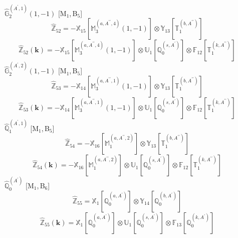 \documentclass[fleqn,10pt,landscape]{article}
\begin{document}
\begin{itemize}
\vspace{4mm}
\noindent {} $\,\,\,\hat{\mathbb{G}}_{2}^{(A^{\prime},1)}(1,-1)$ [M$_{1}$,\,B$_{5}$]
\begin{dmath*}
\hat{\mathbb{Z}}_{52}=- \mathbb{X}_{15}[\mathbb{M}_{3}^{(a,A^{\prime\prime},4)}(1,-1)] \otimes\mathbb{Y}_{13}[\mathbb{T}_{1}^{(b,A^{\prime\prime})}]
\end{dmath*}
\begin{dmath*}
\hat{\mathbb{Z}}_{52}(\bm{k})=- \mathbb{X}_{15}[\mathbb{M}_{3}^{(a,A^{\prime\prime},4)}(1,-1)] \otimes\mathbb{U}_{1}[\mathbb{Q}_{0}^{(s,A^{\prime})}] \otimes\mathbb{F}_{12}[\mathbb{T}_{1}^{(k,A^{\prime\prime})}]
\end{dmath*}
\vspace{4mm}
\noindent {} $\,\,\,\hat{\mathbb{G}}_{2}^{(A^{\prime},2)}(1,-1)$ [M$_{1}$,\,B$_{5}$]
\begin{dmath*}
\hat{\mathbb{Z}}_{53}=- \mathbb{X}_{14}[\mathbb{M}_{3}^{(a,A^{\prime\prime},1)}(1,-1)] \otimes\mathbb{Y}_{13}[\mathbb{T}_{1}^{(b,A^{\prime\prime})}]
\end{dmath*}
\begin{dmath*}
\hat{\mathbb{Z}}_{53}(\bm{k})=- \mathbb{X}_{14}[\mathbb{M}_{3}^{(a,A^{\prime\prime},1)}(1,-1)] \otimes\mathbb{U}_{1}[\mathbb{Q}_{0}^{(s,A^{\prime})}] \otimes\mathbb{F}_{12}[\mathbb{T}_{1}^{(k,A^{\prime\prime})}]
\end{dmath*}
\vspace{4mm}
\noindent {} $\,\,\,\hat{\mathbb{Q}}_{1}^{(A^{\prime},1)}$ [M$_{1}$,\,B$_{5}$]
\begin{dmath*}
\hat{\mathbb{Z}}_{54}=- \mathbb{X}_{16}[\mathbb{M}_{1}^{(a,A^{\prime\prime},2)}] \otimes\mathbb{Y}_{13}[\mathbb{T}_{1}^{(b,A^{\prime\prime})}]
\end{dmath*}
\begin{dmath*}
\hat{\mathbb{Z}}_{54}(\bm{k})=- \mathbb{X}_{16}[\mathbb{M}_{1}^{(a,A^{\prime\prime},2)}] \otimes\mathbb{U}_{1}[\mathbb{Q}_{0}^{(s,A^{\prime})}] \otimes\mathbb{F}_{12}[\mathbb{T}_{1}^{(k,A^{\prime\prime})}]
\end{dmath*}
\vspace{4mm}
\noindent {} $\,\,\,\hat{\mathbb{Q}}_{0}^{(A^{\prime})}$ [M$_{1}$,\,B$_{6}$]
\begin{dmath*}
\hat{\mathbb{Z}}_{55}=\mathbb{X}_{1}[\mathbb{Q}_{0}^{(a,A^{\prime})}] \otimes\mathbb{Y}_{14}[\mathbb{Q}_{0}^{(b,A^{\prime})}]
\end{dmath*}
\begin{dmath*}
\hat{\mathbb{Z}}_{55}(\bm{k})=\mathbb{X}_{1}[\mathbb{Q}_{0}^{(a,A^{\prime})}] \otimes\mathbb{U}_{1}[\mathbb{Q}_{0}^{(s,A^{\prime})}] \otimes\mathbb{F}_{13}[\mathbb{Q}_{0}^{(k,A^{\prime})}]

\end{dmath*}
\end{itemize}
\end{document}
